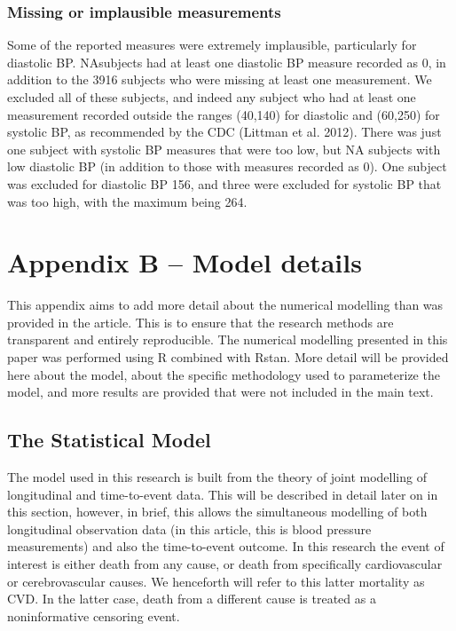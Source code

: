 \documentclass[
]{article}
\begin{document}
\hypertarget{sec:BPrange}{%
\subsubsection{Missing or implausible measurements}\label{sec:BPrange}}

Some of the reported measures were extremely implausible, particularly for diastolic BP. NAsubjects had at least one diastolic BP measure recorded as 0, in addition to the 3916 subjects who were missing at least one measurement. We excluded all of these subjects, and indeed any subject who had at least one measurement recorded outside the ranges (40,140) for diastolic and (60,250) for systolic BP, as recommended by the CDC (Littman et al. 2012).
There was just one subject with systolic BP measures that were too low, but NA subjects with low diastolic BP (in addition to those with measures recorded as 0).
One subject was excluded for diastolic BP 156, and three were excluded for systolic BP that was too high, with the maximum being 264.

\newpage

\hypertarget{appendix-b-model-details}{%
\section{Appendix B -- Model details}\label{appendix-b-model-details}}

This appendix aims to add more detail about the numerical modelling than was provided in the article. This is to ensure that the research methods are transparent and entirely reproducible. The numerical modelling presented in this paper was performed using R combined with Rstan. More detail will be provided here about the model, about the specific methodology used to parameterize the model, and more results are provided that were not included in the main text.

\hypertarget{the-statistical-model}{%
\subsection{The Statistical Model}\label{the-statistical-model}}

The model used in this research is built from the theory of joint modelling of longitudinal and time-to-event data. This will be described in detail later on in this section, however, in brief, this allows the simultaneous modelling of both longitudinal observation data (in this article, this is blood pressure measurements) and also the time-to-event outcome.
In this research the event of interest is either death from any cause, or death from specifically cardiovascular or cerebrovascular causes. We henceforth will refer to this latter mortality as CVD.
In the latter case, death from a different cause is treated as a noninformative censoring event.
\end{document}
